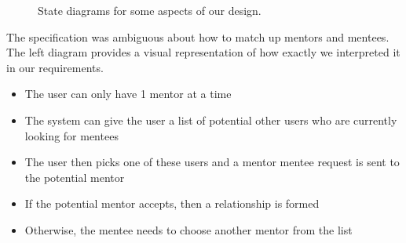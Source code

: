 \documentclass[10pt]{article}
\begin{document}
\begin{figure}[H]
    \centering
    \qquad
    \caption{State diagrams for some aspects of our design.}
    \label{fig:state_diagrams}
\end{figure}

The specification was ambiguous about how to match up mentors and mentees. The
left diagram provides a visual representation of how exactly we interpreted it
in our requirements.
\begin{itemize}[leftmargin=1.2cm,noitemsep,align=left]
    \item The user can only have 1 mentor at a time
    \item The system can give the user a list of potential other users who are currently looking for mentees
    \item The user then picks one of these users and a mentor mentee request is sent to the potential mentor
    \item If the potential mentor accepts, then a relationship is formed
    \item Otherwise, the mentee needs to choose another mentor from the list
\end{itemize}
\end{document}
